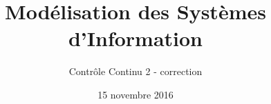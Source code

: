 \title{
   Modélisation des Systèmes d'Information
}
\author{
	Contrôle Continu 2 - correction
}
\date{15 novembre 2016}
